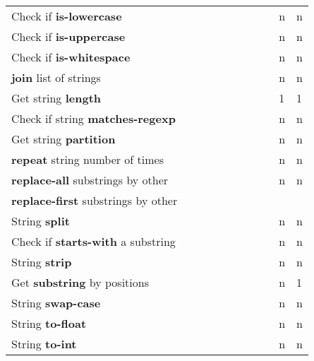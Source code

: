\documentclass[anonymous,sigplan,review,11pt,nonacm,natbib=false]{acmart}
\begin{document}
\begin{longtable}{lllllllllll}
        Check if \textbf{is-lowercase} &  &  &  &  &  & &  &  & n & n \\

        Check if \textbf{is-uppercase} &  &  &  &  &  & &  &  & n & n \\

        Check if \textbf{is-whitespace} &  &  &  &  &  & &  &  & n & n \\

        \textbf{join} list of strings &  &  &  &  &  & &  &  & n & n \\

        Get string \textbf{length} &  &  &  &  &  & &  &  & 1 & 1 \\

        Check if string \textbf{matches-regexp} &  &  &  &  &  & &  &  & n & n \\

        Get string \textbf{partition} &  &  &  &  &  & &  &  & n & n \\

        \textbf{repeat} string number of times &  &  &  &  &  & &  &  & n & n \\

        \textbf{replace-all} substrings by other &  &  &  &  &  & &  &  & n & n \\

        \textbf{replace-first} substrings by other &  &  &  &  &  &  &  &  &  & \\

        String \textbf{split} &  &  &  &  &  & &  &  & n & n \\

        Check if \textbf{starts-with} a substring &  &  &  &  &  & &  &  & n & n \\

        String \textbf{strip} &  &  &  &  &  & &  &  & n & n \\

        Get \textbf{substring} by positions &  &  &  &  &  & &  &  & n & 1 \\

        String \textbf{swap-case} &  &  &  &  &  & &  &  & n & n \\

        String \textbf{to-float} &  &  &  &  &  & &  &  & n & n \\

        String \textbf{to-int} &  &  &  &  &  & &  &  & n & n \\


\end{longtable}
\end{document}
